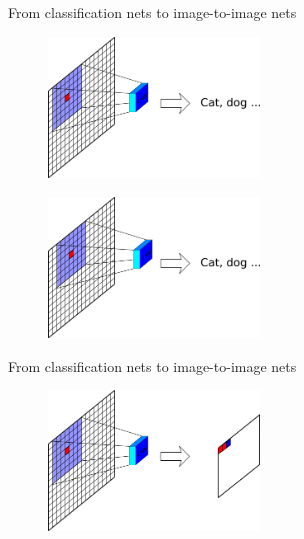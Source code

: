 \documentclass[xcolor=pdftex,dvipsnames,table,mathserif]{beamer}
\begin{document}
\begin{frame}{From classification nets to image-to-image nets}

      \begin{figure}
      \includegraphics[width=0.5\textwidth]{image_transf1.png}
      \end{figure}

      \pause

      \begin{figure}
      \includegraphics[width=0.5\textwidth]{image_transf2.png}
      \end{figure}

\end{frame}

\begin{frame}{From classification nets to image-to-image nets}

      \begin{figure}
      \includegraphics[width=0.5\textwidth]{image_transf_fin.png}
      \end{figure}

\end{frame}
\end{document}
